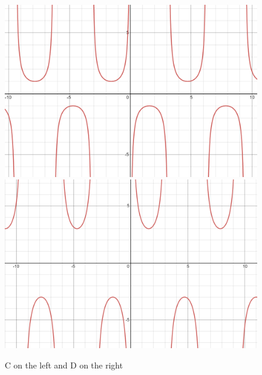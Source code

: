 \documentclass{ximera}
\begin{document}
\begin{exercise}
\begin{enumerate}
\begin{figure}[!h]
\begin{image}
\includegraphics{ex8-c.png}
\hspace{20mm}
\includegraphics{ex8-d.png}
\end{image}
\caption{C on the left and D on the right}
\end{figure}

\begin{multipleChoice}
\end{multipleChoice}

\end{enumerate}
\end{exercise}
\end{document}
